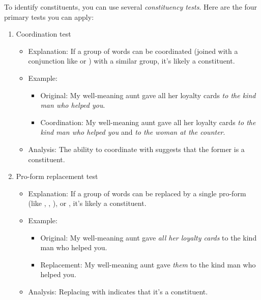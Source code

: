 To identify constituents, you can use several \emph{constituency tests}. Here are the four primary tests you can apply:

\begin{enumerate}[noitemsep]
    \item Coordination test
    \begin{itemize}[noitemsep]
        \item Explanation: If a group of words can be coordinated (joined with a conjunction like  or ) with a similar group, it's likely a constituent.
        \item Example:
        \begin{itemize}[noitemsep]
            \item Original: My well-meaning aunt gave all her loyalty cards \emph{to the kind man who helped you}.
            \item Coordination: My well-meaning aunt gave all her loyalty cards \emph{to the kind man who helped you} and \emph{to the woman at the counter}.
        \end{itemize}
        \item Analysis: The ability to coordinate  with  suggests that the former is a constituent.
    \end{itemize}

    \item Pro-form replacement test
    \begin{itemize}[noitemsep]
        \item Explanation: If a group of words can be replaced by a single pro-form (like , , ), or , it's likely a constituent.
        \item Example:
        \begin{itemize}[noitemsep]
            \item Original: My well-meaning aunt gave \emph{all her loyalty cards} to the kind man who helped you.
            \item Replacement: My well-meaning aunt gave \emph{them} to the kind man who helped you.
        \end{itemize}
        \item Analysis: Replacing  with  indicates that it's a constituent.
    \end{itemize}
    

\end{enumerate}
